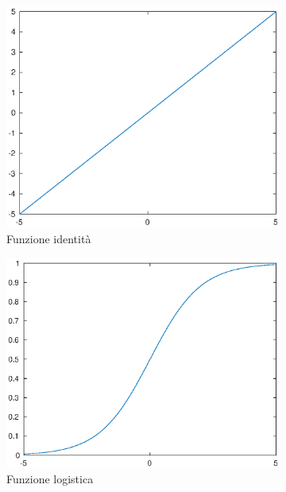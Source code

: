 \begin{figure}[h!]
	\centering
	\begin{subfigure}[b]{0.30\textwidth}
		\includegraphics[width=\linewidth]{immagini/id}
		\caption{Funzione identità}
		\label{att:(a)}
	\end{subfigure}%
	\begin{subfigure}[b]{0.30\textwidth}
		\includegraphics[width=\linewidth]{immagini/logistic}
		\caption{Funzione logistica}
		\label{att:(b)}
	\end{subfigure}%
	\begin{subfigure}[b]{0.30\textwidth}

\end{subfigure}
\end{figure}
